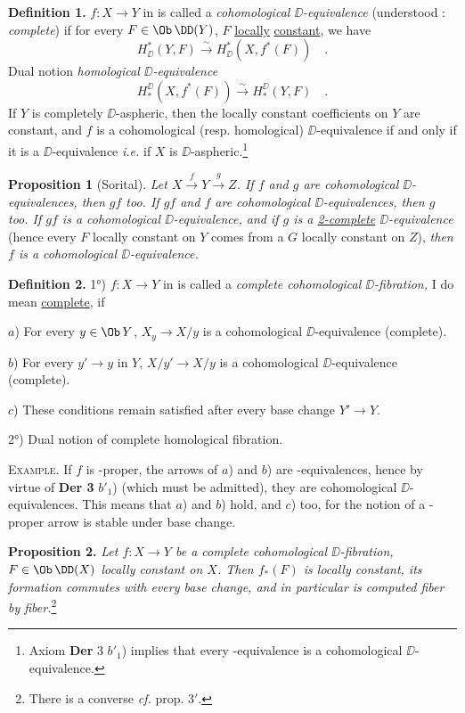 \textbf{Definition 1.} $f : X \to Y$ in \Dia{} is called a \textit{cohomological $\DD$-equivalence} (understood : \textit{complete}) if for every $F \in \Ob\,\DD(Y)$, $F$ \underline{locally} \underline{constant}, we have
\[
H^*_{\DD}(Y,F) \overset{\sim}{\longrightarrow} H^*_{\DD}(X, f^*(F)) \quad .
\]
Dual notion \textit{homological $\DD$-equivalence}
\[
H_*^{\DD}(X, f^*(F)) \overset{\sim}{\longrightarrow} H_*^{\DD}(Y,F) \quad .
\]
If $Y$ is completely $\DD$-aspheric, then the locally constant coefficients on $Y$ are constant, and $f$ is a cohomological (resp. homological) $\DD$-equivalence if and only if it is a $\DD$-equivalence \textit{i.e.} if $X$ is $\DD$-aspheric.\footnote[53]{Axiom \textbf{Der} 3 $b'_1$) implies that every \Hot-equivalence is a cohomological $\DD$-equivalence.}

\textbf{Proposition 1} (Sorital). \textit{Let $X \overset{f}{\to} Y \overset{g}{\to} Z$. If $f$ and $g$ are cohomological $\DD$-equivalences, then $gf$ too. If $gf$ and $f$ are cohomological $\DD$-equivalences, then $g$ too. If $gf$ is a cohomological $\DD$-equivalence, and if $g$ is a \underline{2-complete} $\DD$-equivalence} (hence every $F$ locally constant on $Y$ comes from a $G$ locally constant on $Z$), \textit{then $f$ is a cohomological $\DD$-equivalence.}

\textbf{Definition 2.} 1°) $f : X \to Y$ in \Dia{} is called a \textit{complete cohomological $\DD$-fibration,} I do mean \underline{complete}, if

$a$) For every $y \in \Ob\, Y$, $X_y \to X/y$ is a cohomological $\DD$-equivalence (complete).

$b$) For every $y' \to y$ in $Y$, $X/y' \to X/y$ is a cohomological $\DD$-equivalence (complete).


$c$) These conditions remain satisfied after every base change $Y' \to Y$.

2°) Dual notion of complete homological fibration.

\textsc{Example.} If $f$ is \Hot-proper, the arrows of $a$) and $b$) are \Hot-equivalences, hence by virtue of \textbf{Der 3} $b'_1$) (which must be admitted), they are cohomological $\DD$-equivalences. This means that $a$) and $b$) hold, and $c$) too, for the notion of a \Hot-proper arrow is stable under base change.

\textbf{Proposition 2.} \textit{Let $f : X \to Y$ be a complete cohomological $\DD$-fibration, $F \in \Ob\,\DD(X)$ locally constant on $X$. Then $f_*(F)$ is locally constant, its formation commutes with every base change, and in particular is computed fiber by fiber.}\footnote[54]{There is a converse \textit{cf.} prop. 3$'$.}

